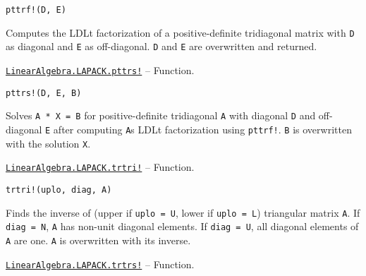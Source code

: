 \begin{adjustwidth}{2em}{0pt}


\begin{verbatim}
pttrf!(D, E)
\end{verbatim}

Computes the LDLt factorization of a positive-definite tridiagonal matrix with \texttt{D} as diagonal and \texttt{E} as off-diagonal. \texttt{D} and \texttt{E} are overwritten and returned.



\end{adjustwidth}
\hypertarget{17187703179587619260}{}
\hyperlink{17187703179587619260}{\texttt{LinearAlgebra.LAPACK.pttrs!}}  -- {Function.}

\begin{adjustwidth}{2em}{0pt}


\begin{verbatim}
pttrs!(D, E, B)
\end{verbatim}

Solves \texttt{A * X = B} for positive-definite tridiagonal \texttt{A} with diagonal \texttt{D} and off-diagonal \texttt{E} after computing \texttt{A}{\textquotesingle}s LDLt factorization using \texttt{pttrf!}. \texttt{B} is overwritten with the solution \texttt{X}.



\end{adjustwidth}
\hypertarget{16492831209199043329}{}
\hyperlink{16492831209199043329}{\texttt{LinearAlgebra.LAPACK.trtri!}}  -- {Function.}

\begin{adjustwidth}{2em}{0pt}


\begin{verbatim}
trtri!(uplo, diag, A)
\end{verbatim}

Finds the inverse of (upper if \texttt{uplo = U}, lower if \texttt{uplo = L}) triangular matrix \texttt{A}. If \texttt{diag = N}, \texttt{A} has non-unit diagonal elements. If \texttt{diag = U}, all diagonal elements of \texttt{A} are one. \texttt{A} is overwritten with its inverse.



\end{adjustwidth}
\hypertarget{1291729511408073349}{}
\hyperlink{1291729511408073349}{\texttt{LinearAlgebra.LAPACK.trtrs!}}  -- {Function.}

